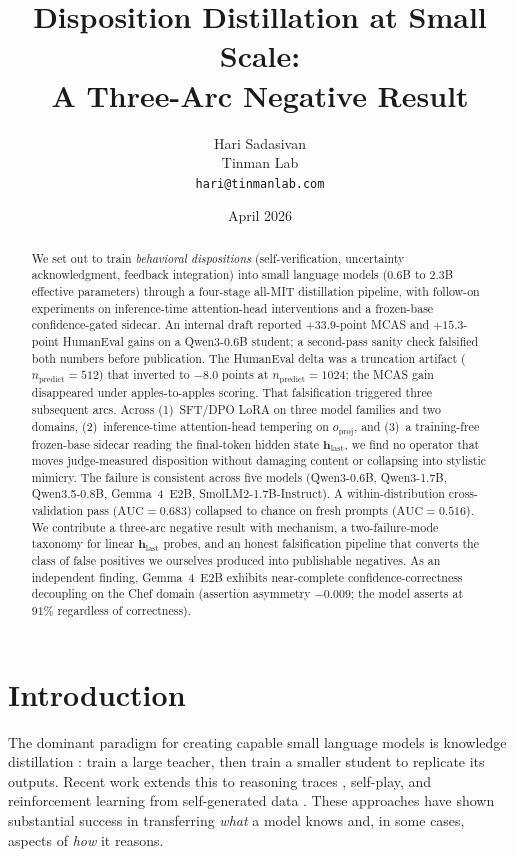 \documentclass[11pt,a4paper]{article}
\title{\textbf{Disposition Distillation at Small Scale:\\A Three-Arc Negative Result}}
\author{
Hari Sadasivan\\
Tinman Lab\\
\texttt{hari@tinmanlab.com}
}
\date{April 2026}
\begin{document}
\maketitle

\begin{abstract}
We set out to train \emph{behavioral dispositions} (self-verification, uncertainty acknowledgment, feedback integration) into small language models (0.6B to 2.3B effective parameters) through a four-stage all-MIT distillation pipeline, with follow-on experiments on inference-time attention-head interventions and a frozen-base confidence-gated sidecar. An internal draft reported $+33.9$-point MCAS and $+15.3$-point HumanEval gains on a Qwen3-0.6B student; a second-pass sanity check falsified both numbers before publication. The HumanEval delta was a truncation artifact ($n_{\text{predict}}{=}512$) that inverted to $-8.0$ points at $n_{\text{predict}}{=}1024$; the MCAS gain disappeared under apples-to-apples scoring. That falsification triggered three subsequent arcs. Across (1)~SFT/DPO LoRA on three model families and two domains, (2)~inference-time attention-head tempering on $o_{\text{proj}}$, and (3)~a training-free frozen-base sidecar reading the final-token hidden state $\mathbf{h}_{\text{last}}$, we find no operator that moves judge-measured disposition without damaging content or collapsing into stylistic mimicry. The failure is consistent across five models (Qwen3-0.6B, Qwen3-1.7B, Qwen3.5-0.8B, Gemma~4~E2B, SmolLM2-1.7B-Instruct). A within-distribution cross-validation pass ($\text{AUC}{=}0.683$) collapsed to chance on fresh prompts ($\text{AUC}{=}0.516$). We contribute a three-arc negative result with mechanism, a two-failure-mode taxonomy for linear $\mathbf{h}_{\text{last}}$ probes, and an honest falsification pipeline that converts the class of false positives we ourselves produced into publishable negatives. As an independent finding, Gemma~4~E2B exhibits near-complete confidence-correctness decoupling on the Chef domain (assertion asymmetry $-0.009$; the model asserts at $91\%$ regardless of correctness).
\end{abstract}

\section{Introduction}

The dominant paradigm for creating capable small language models is knowledge distillation \cite{hinton2015distilling}: train a large teacher, then train a smaller student to replicate its outputs. Recent work extends this to reasoning traces \cite{hsieh2023distilling}, self-play, and reinforcement learning from self-generated data \cite{zelikman2022star}. These approaches have shown substantial success in transferring \emph{what} a model knows and, in some cases, aspects of \emph{how} it reasons.
\end{document}
